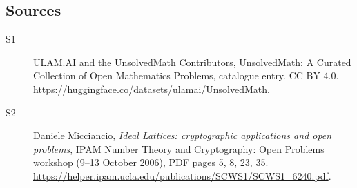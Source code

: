\documentclass[11pt]{article}
\begin{document}
\subsection{Sources}
\begin{description}
\item[\hypertarget{source:statement:1}{S1}] ULAM.AI and the UnsolvedMath Contributors, UnsolvedMath: A Curated Collection of Open Mathematics Problems, catalogue entry. CC BY 4.0. \url{https://huggingface.co/datasets/ulamai/UnsolvedMath}.
\item[\hypertarget{source:statement:2}{S2}] Daniele Micciancio, \emph{Ideal Lattices: cryptographic applications and open problems}, IPAM Number Theory and Cryptography: Open Problems workshop (9--13 October 2006), PDF pages 5, 8, 23, 35. \url{https://helper.ipam.ucla.edu/publications/SCWS1/SCWS1_6240.pdf}.
\end{description}
\label{end:statement}
\end{document}
